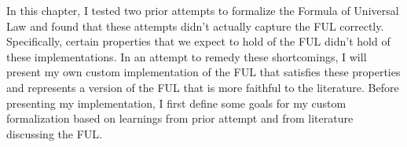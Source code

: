 %
\begin{isabellebody}%
%
%
\isadelimtheory
%
\endisadelimtheory
%
\isatagtheory
%
\endisatagtheory
{\isafoldtheory}%
%
\isadelimtheory
%
\endisadelimtheory
%
\isadelimdocument
%
\endisadelimdocument
%
\isatagdocument
%
\isamarkuptrue%
%
\endisatagdocument
{\isafolddocument}%
%
\isadelimdocument
%
\endisadelimdocument
%
\begin{isamarkuptext}%
In this chapter, I tested two prior attempts to formalize the Formula of Universal Law and found 
that these attempts didn't actually capture the FUL correctly. Specifically, certain properties that 
we expect to hold of the FUL didn't hold of these implementations. In an attempt to remedy these 
shortcomings, I will present my own custom implementation of the FUL that satisfies these properties
and represents a version of the FUL that is more faithful to the literature. Before presenting my 
implementation, I first define some goals for my custom formalization based on learnings from prior
attempt and from literature discussing the FUL.


\end{isamarkuptext}
\end{isabellebody}
